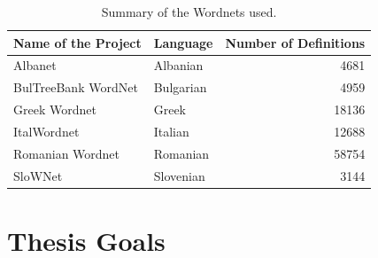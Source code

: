 \begin{table}[htbp]
    \centering
    \begin{tabular}{llr}
        \toprule%
        \textbf{Name of the Project} & \textbf{Language} & \textbf{Number of Definitions} \\
        \midrule%
        Albanet & Albanian & 4681 \\
        BulTreeBank WordNet & Bulgarian & 4959 \\
        Greek Wordnet & Greek & 18136 \\
        ItalWordnet & Italian & 12688 \\
        Romanian Wordnet & Romanian & 58754 \\
        SloWNet & Slovenian & 3144 \\
        \bottomrule %
    \end{tabular}
    \caption{Summary of the Wordnets used.}%
    \label{tab:summary_table}%
\end{table}


\section{Thesis Goals}%
\label{sec:thesis_goals}


